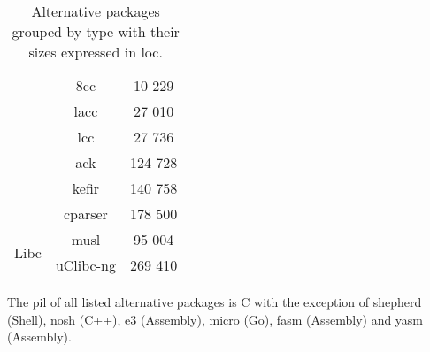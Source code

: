 \begin{table}[!ht]
\begin{tabular}{|c|c|c|}
        \cline{2-3}
        & 8cc \cite{8cc} & 10 229 \\
        \cline{2-3}
        & lacc \cite{lacc} & 27 010 \\
        \cline{2-3}
        & lcc \cite{lcc} \footnotemark[4] & 27 736 \\
        \cline{2-3}
        & ack \cite{ack} & 124 728 \\
        \cline{2-3}
        & kefir \cite{kefir} & 140 758 \\
        \cline{2-3}
        & cparser \cite{cparser} & 178 500 \\
        \hline
        \hline
        \multirow{2}{*}{Libc}
        & musl \cite{musl} & 95 004 \\
        \cline{2-3}
        & uClibc-ng \cite{uclibc-ng} & 269 410 \\
        \hline
    \end{tabular}
    \caption{Alternative packages grouped by type with their sizes expressed in \gls{loc}.}
    \label{table:Alternative packages}
\end{table}


The \gls{pil} of all listed alternative packages is C with the exception of shepherd (Shell), nosh (C++), e3 (Assembly), micro (Go), fasm (Assembly) and yasm (Assembly).

